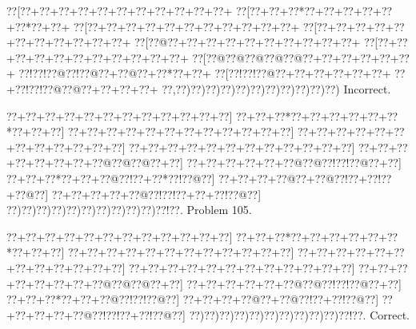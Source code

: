 \documentclass[a5paper]{article}
\begin{document}
\begin{center}
{\goo
\0??[\0??+\0??+\0??+\0??+\0??+\0??+\0??+\0??+\0??+\0??+\0??+
\0??[\0??+\0??+\0??*\0??+\0??+\0??+\0??+\0??+\0??*\0??+\0??+
\0??[\0??+\0??+\0??+\0??+\0??+\0??+\0??+\0??+\0??+\0??+\0??+
\0??[\0??+\0??+\0??+\0??+\0??+\0??+\0??+\0??+\0??+\0??+\0??+
\0??[\0??@\0??+\0??+\0??+\0??+\0??+\0??+\0??+\0??+\0??+\0??+
\0??[\0??+\0??+\0??+\0??+\0??+\0??+\0??+\0??+\0??+\0??+\0??+
\0??[\0??@\0??@\0??@\0??@\0??@\0??+\0??+\0??+\0??+\0??+\0??+
\0??!\0??!\0??@\0??!\0??@\0??+\0??@\0??+\0??*\0??+\0??+
\0??[\0??!\0??!\0??@\0??+\0??+\0??+\0??+\0??+\0??+
\0??+\0??!\0??!\0??@\0??@\0??+\0??+\0??+\0??+
\0??,\0??)\0??)\0??)\0??)\0??)\0??)\0??)\0??)\0??)\0??)\0??)
}
Incorrect. 

\end{center}
\newpage
\begin{center}
{\goo
\0??+\0??+\0??+\0??+\0??+\0??+\0??+\0??+\0??+\0??+\0??+\0??]
\0??+\0??+\0??*\0??+\0??+\0??+\0??+\0??+\0??*\0??+\0??+\0??]
\0??+\0??+\0??+\0??+\0??+\0??+\0??+\0??+\0??+\0??+\0??+\0??]
\0??+\0??+\0??+\0??+\0??+\0??+\0??+\0??+\0??+\0??+\0??+\0??]
\0??+\0??+\0??+\0??+\0??+\0??+\0??+\0??+\0??+\0??+\0??+\0??]
\0??+\0??+\0??+\0??+\0??+\0??+\0??+\0??@\0??@\0??@\0??+\0??]
\0??+\0??+\0??+\0??+\0??+\0??@\0??@\0??!\0??!\0??@\0??+\0??]
\0??+\0??+\0??*\0??+\0??+\0??@\0??!\0??+\0??*\0??!\0??@\0??]
\0??+\0??+\0??+\0??@\0??+\0??@\0??!\0??+\0??!\0??+\0??@\0??]
\0??+\0??+\0??+\0??+\0??@\0??!\0??!\0??+\0??+\0??!\0??@\0??]
\0??)\0??)\0??)\0??)\0??)\0??)\0??)\0??)\0??)\0??)\0??!\0??.
}
Problem 105.

\end{center}
\begin{center}
{\goo
\0??+\0??+\0??+\0??+\0??+\0??+\0??+\0??+\0??+\0??+\0??+\0??]
\0??+\0??+\0??*\0??+\0??+\0??+\0??+\0??+\0??*\0??+\0??+\0??]
\0??+\0??+\0??+\0??+\0??+\0??+\0??+\0??+\0??+\0??+\0??+\0??]
\0??+\0??+\0??+\0??+\0??+\0??+\0??+\0??+\0??+\0??+\0??+\0??]
\0??+\0??+\0??+\0??+\0??+\0??+\0??+\0??+\0??+\0??+\0??+\0??]
\0??+\0??+\0??+\0??+\0??+\0??+\0??+\0??@\0??@\0??@\0??+\0??]
\0??+\0??+\0??+\0??+\0??+\0??@\0??@\0??!\0??!\0??@\0??+\0??]
\0??+\0??+\0??*\0??+\0??+\0??@\0??!\0??!\0??@\0??]
\0??+\0??+\0??+\0??@\0??+\0??@\0??!\0??+\0??!\0??@\0??]
\0??+\0??+\0??+\0??+\0??@\0??!\0??!\0??+\0??!\0??@\0??]
\0??)\0??)\0??)\0??)\0??)\0??)\0??)\0??)\0??)\0??)\0??!\0??.
}
Correct. 

\end{center}
\end{document}
